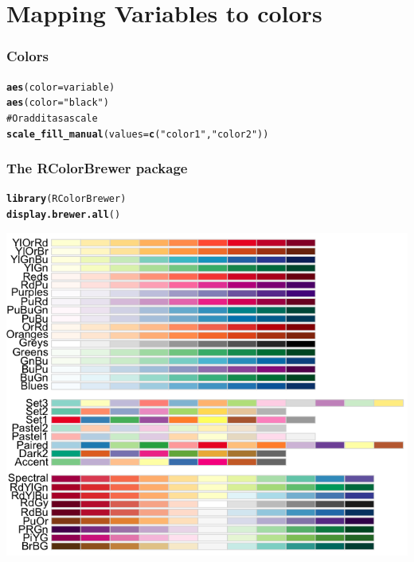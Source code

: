 \documentclass{beamer}\usepackage{graphicx, color}
\makeatletter
\newcommand{\hlfunctioncall}[1]{\textcolor[rgb]{0.501960784313725,0,0.329411764705882}{\textbf{#1}}}%
\newcommand{\hlstring}[1]{\textcolor[rgb]{0.6,0.6,1}{#1}}%
\newcommand{\hlcomment}[1]{\textcolor[rgb]{0.180392156862745,0.6,0.341176470588235}{#1}}%
\newenvironment{kframe}{%
 \def\at@end@of@kframe{}%
 \ifinner\ifhmode%
  \def\at@end@of@kframe{\end{minipage}}%
  \begin{minipage}{\columnwidth}%
 \fi\fi%
 \def\FrameCommand##1{\hskip\@totalleftmargin \hskip-\fboxsep
 \colorbox{shadecolor}{##1}\hskip-\fboxsep
     \hskip-\linewidth \hskip-\@totalleftmargin \hskip\columnwidth}%
 \MakeFramed {\advance\hsize-\width
   \@totalleftmargin\z@ \linewidth\hsize
   \@setminipage}}%
 {\par\unskip\endMakeFramed%
 \at@end@of@kframe}
\newenvironment{knitrout}{}{} %
\makeatother
\begin{document}
\section*{Mapping Variables to colors}
\frame{\sectionpage}


\begin{frame}[fragile]
\frametitle{Colors}
\begin{knitrout}\footnotesize
{}\color{fgcolor}\begin{kframe}
\begin{alltt}
\hlfunctioncall{aes}(color = variable)
\hlfunctioncall{aes}(color = \hlstring{"black"})
\hlcomment{# Or add it as a scale}
\hlfunctioncall{scale_fill_manual}(values = \hlfunctioncall{c}(\hlstring{"color1"}, \hlstring{"color2"}))
\end{alltt}
\end{kframe}
\end{knitrout}

\end{frame}


\begin{frame}[fragile]
\frametitle{The RColorBrewer package}
\begin{knitrout}\footnotesize
{}\color{fgcolor}\begin{kframe}
\begin{alltt}
\hlfunctioncall{library}(RColorBrewer)
\hlfunctioncall{display.brewer.all}()
\end{alltt}
\end{kframe}
\end{knitrout}

\includegraphics[scale=0.25]{images/color_palette.png}
\end{frame}
\end{document}
